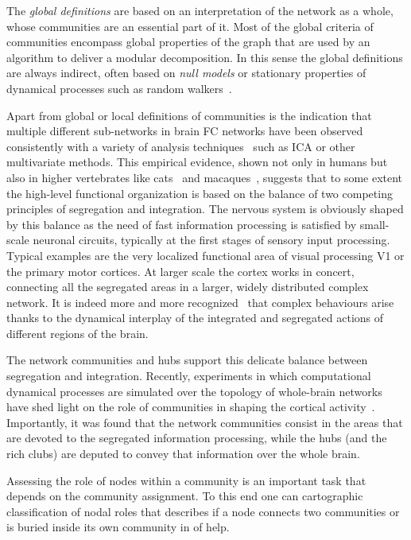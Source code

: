 The \emph{global definitions} are based on an interpretation of the network as a whole, whose communities are an essential part of it.
Most of the global criteria of communities encompass global properties of the graph that are used by an algorithm to deliver a modular decomposition.
In this sense the global definitions are always indirect, often based on \emph{null models} or stationary properties of dynamical processes such as random walkers~\cite{pons2006,rosvall2008}.

Apart from global or local definitions of communities is the indication that multiple different sub-networks in brain FC networks have been observed consistently with a variety of analysis techniques~\cite{fox2005,deluca2006,schwarz2007} such as ICA or other multivariate methods.
This empirical evidence, shown not only in humans but also in higher vertebrates like cats~\cite{scannell1995} and macaques~\cite{felleman1991}, suggests that to some extent the high-level functional organization is based on the balance of two competing principles of segregation and integration.
The nervous system is obviously shaped by this balance as the need of fast information processing is satisfied by small-scale neuronal circuits, typically at the first stages of sensory input processing.
Typical examples are the very localized functional area of visual processing V1 or the primary motor cortices. At larger scale the cortex works in concert, connecting all the segregated areas in a larger, widely distributed complex network.
It is indeed more and more recognized~\cite{tononi1994,tononi1998,deco2015} that complex behaviours arise thanks to the dynamical interplay of the integrated and segregated actions of different regions of the brain.

The network communities and hubs support this delicate balance between segregation and integration.
Recently, experiments in which computational dynamical processes are simulated over the topology of whole-brain networks have shed light on the role of communities in shaping the cortical activity~\cite{deco2015}. Importantly, it was found that the network communities consist in the areas that are devoted to the segregated information processing, while the hubs (and the rich clubs) are deputed to convey that information over the whole brain.

Assessing the role of nodes within a community is an important task that depends on the community assignment. To this end one can  cartographic classification of nodal roles that describes if a node connects two communities or is buried inside its own community in of help.

